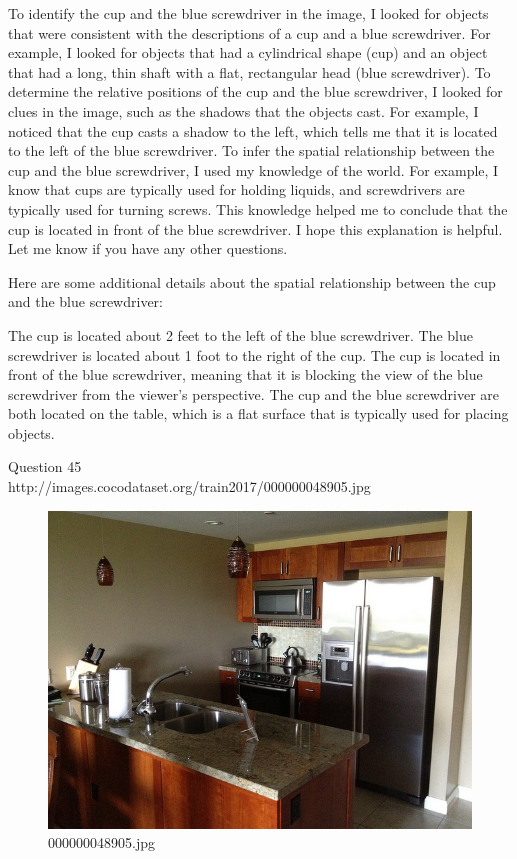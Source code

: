 \begin{enumerate}
    To identify the cup and the blue screwdriver in the image, I looked for objects that were consistent with the descriptions of a cup and a blue screwdriver. For example, I looked for objects that had a cylindrical shape (cup) and an object that had a long, thin shaft with a flat, rectangular head (blue screwdriver).
    To determine the relative positions of the cup and the blue screwdriver, I looked for clues in the image, such as the shadows that the objects cast. For example, I noticed that the cup casts a shadow to the left, which tells me that it is located to the left of the blue screwdriver.
    To infer the spatial relationship between the cup and the blue screwdriver, I used my knowledge of the world. For example, I know that cups are typically used for holding liquids, and screwdrivers are typically used for turning screws. This knowledge helped me to conclude that the cup is located in front of the blue screwdriver.
    I hope this explanation is helpful. Let me know if you have any other questions.
    
    Here are some additional details about the spatial relationship between the cup and the blue screwdriver:
    
    The cup is located about 2 feet to the left of the blue screwdriver.
    The blue screwdriver is located about 1 foot to the right of the cup.
    The cup is located in front of the blue screwdriver, meaning that it is blocking the view of the blue screwdriver from the viewer's perspective.
    The cup and the blue screwdriver are both located on the table, which is a flat surface that is typically used for placing objects.
\end{enumerate}
Question 45\\
http://images.cocodataset.org/train2017/000000048905.jpg
\begin{figure}[h]
    \centering
    \includegraphics[width=0.8\linewidth]{../image set/hard/000000048905.jpg}
    \caption{000000048905.jpg}
\end{figure}
